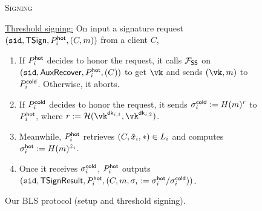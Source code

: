 \begin{figure*}
\begin{mdframed}
\begin{enumerate}
    \end{enumerate}
    \begin{center}
        \textsc{Signing}
    \end{center}
    \underline{Threshold signing:} On input a signature request $(\texttt{sid}, \mathsf{TSign}, P_i^{\mathsf{hot}}, (C, m))$ from a client $C$,
    \begin{enumerate}
        \item If $P_i^{\mathsf{hot}}$ decides to honor the request, 
        it calls $\mathcal{F}_\mathsf{SS}$ on $(\texttt{sid}, \mathsf{AuxRecover}, P_i^{\mathsf{hot}}, (C))$ to get $\vk$ and sends 
        $(\vk, m)$ to $P_i^{\mathsf{cold}}$. Otherwise, it aborts.
        \item If $P_i^{\mathsf{cold}}$ decides to honor the request, it 
        sends $\sigma_i^{\mathsf{cold}} := H(m)^r$ 
        to $P_i^{\mathsf{hot}}$,
        where $r := \lhlhash(\vk^{\dk_{i,1}}, \vk^{\dk_{i,2}})$.
        \item Meanwhile, $P_i^{\mathsf{hot}}$ retrieves $(C, \tilde{x}_i, *) \in L_i$ and computes $\sigma_i^{\mathsf{hot}} := H(m)^{\tilde{x}_i}$.
        \item Once it receives 
        $\sigma_i^{\mathsf{cold}}$, $P_i^{\mathsf{hot}}$ outputs $(\texttt{sid}, \mathsf{TSignResult}, P_i^{\mathsf{hot}}, (C, m, \sigma_i := \sigma_i^{\mathsf{hot}}/\sigma_i^{\mathsf{cold}}))$.
    \end{enumerate}
    \end{mdframed}
    \caption{Our BLS \hcwl protocol (setup and threshold signing).}
    \label{fig:hc_bls1}
\end{figure*}
